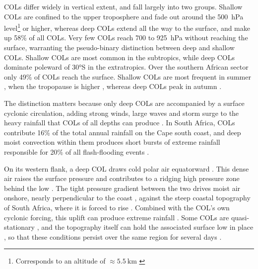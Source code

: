 \documentclass{article}
\begin{document}
COLs differ widely in vertical extent, and fall largely into two groups.
Shallow COLs are confined to the upper troposphere and fade out around the \qty{500}{\hecto \pascal} level\footnote{Corresponds to an altitude of $\approx \qty{5.5}{\kilo\meter}$ \cite{Stull2015}} or higher, whereas deep COLs extend all the way to the surface, and make up 58\% of all COLs.
Very few COLs reach 700 to \qty{925}{\hecto \pascal} without reaching the surface, warranting the pseudo-binary distinction between deep and shallow COLs.
Shallow COLs are most common in the subtropics, while deep COLs dominate poleward of \ang{30}S in the extratropics.
Over the southern African sector only 49\% of COLs reach the surface.
Shallow COLs are most frequent in summer \cite{Barnes2021col}, when the tropopause is higher \cite{SeidelRandel2006}, whereas deep COLs peak in autumn \cite{Barnes2021col}.

The distinction matters because only deep COLs are accompanied by a surface cyclonic circulation, adding strong winds, large waves and storm surge to the heavy rainfall that COLs of all depths can produce \cite{Barnes2021col,NdaranaWaugh2010}.
In South Africa, COLs contribute 16\% of the total annual rainfall on the Cape south coast, and deep moist convection within them produces short bursts of extreme rainfall responsible for 20\% of all flash-flooding events \cite{Barnes2021col}.

On its western flank, a deep COL draws cold polar air equatorward \cite{Barnes2021col, NdaranaWaugh2010, SingletonReason2007}.
This dense air raises the surface pressure and contributes to a ridging high pressure zone behind the low \cite{Barnes2021col}.
The tight pressure gradient between the two drives moist air onshore, nearly perpendicular to the coast \cite{Ndarana2018, Barnes2021capestorm}, against the steep coastal topography of South Africa, where it is forced to rise \cite{SingletonReason2007}.
Combined with the COL's own cyclonic forcing, this uplift can produce extreme rainfall  \cite{Barnes2021capestorm,SingletonReason2007}.
Some COLs are quasi-stationary \cite{NdaranaWaugh2010}, and the topography itself can hold the associated surface low in place \cite{SingletonReason2007}, so that these conditions persist over the same region for several days \cite{Barnes2021col}.
\end{document}
